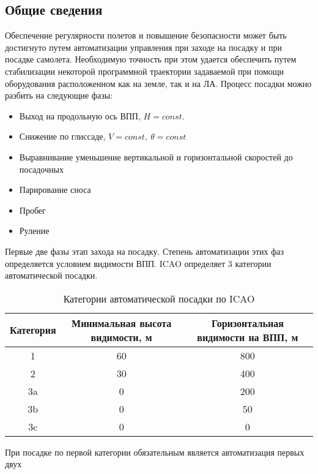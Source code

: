\documentclass{article}
\begin{document}
\subsection{Общие сведения}
Обеспечение регулярности полетов и повышение безопасности может быть достигнуто
путем автоматизации управления при заходе на посадку и при посадке самолета.
Необходимую точность при этом удается обеспечить путем стабилизации некоторой
программной траектории задаваемой при помощи оборудования расположенном как на
земле, так и на ЛА.
Процесс посадки можно разбить на следующие фазы:
\begin{figure}[H]
	\centering
	\label{fig:fig_65}
\end{figure}
\begin{itemize}
	\item  Выход на продольную ось ВПП, $H=const$.
	\item Снижение по глиссаде, $V=const, \ \theta = const$
	\item Выравнивание уменьшение вертикальной и горизонтальной скоростей до
	      посадочных
	\item Парирование сноса
	\item Пробег
	\item Руление
\end{itemize}
Первые две фазы этап захода на посадку. Степень автоматизации этих фаз
определяется условием видимости ВПП. ICAO определяет 3 категории
автоматической посадки.
\begin{table}[H]
	\centering
	\caption{Категории автоматической посадки по ICAO}
	\label{tab:label}
	\begin{tabular}{|c|c|c|}
        \hline
		Категория & Минимальная высота видимости, м & Горизонтальная видимости
		на ВПП, м                                                              \\
        \hline
		1         & 60                              & 800
		\\
		2         & 30                              & 400
		\\
		3a        & 0                               & 200
		\\
		3b        & 0                               & 50
		\\
		3c        & 0                               & 0
		\\
        \hline
	\end{tabular}
\end{table}
При посадке по первой категории обязательным является автоматизация первых двух
\end{document}
